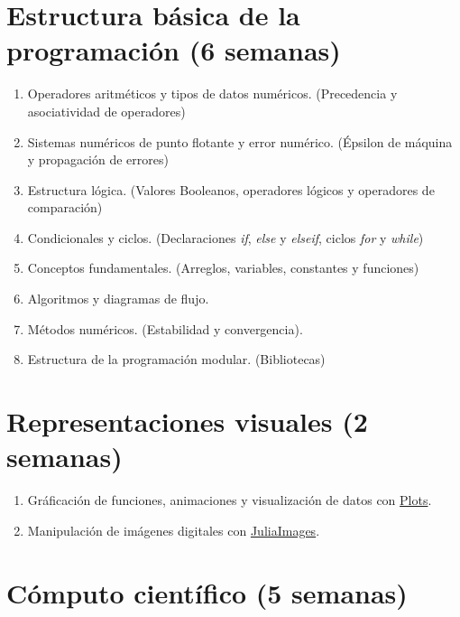 \documentclass[a4paper]{article}
\begin{document}
\section{Estructura básica de la programación (6 semanas)} \label{Sec: Estructura básica de la programación (3 semanas)}

\begin{enumerate}[label=\arabic*.]

    \item Operadores aritméticos y tipos de datos numéricos. (Precedencia y asociatividad de operadores)
    \item Sistemas numéricos de punto flotante y error numérico. (Épsilon de máquina y propagación de errores)
    \item Estructura lógica. (Valores Booleanos, operadores lógicos y operadores de comparación)
    \item Condicionales y ciclos. (Declaraciones \emph{if}, \emph{else} y \emph{elseif}, ciclos \emph{for} y \emph{while})
    \item Conceptos fundamentales. (Arreglos, variables, constantes y funciones)
    \item Algoritmos y diagramas de flujo.
    \item Métodos numéricos. (Estabilidad y convergencia).
    \item Estructura de la programación modular. (Bibliotecas)
\end{enumerate}

\section{Representaciones visuales (2 semanas)} \label{Sec: Representaciones visuales (2 semanas)}

\begin{enumerate}[label=\arabic*.]

    \item Gráficación de funciones, animaciones y visualización de datos  con \href{https://docs.juliaplots.org/latest/}{Plots}.
    \item Manipulación de imágenes digitales con \href{https://juliaimages.org/latest/}{JuliaImages}.
\end{enumerate}

\section{Cómputo científico (5 semanas)} \label{Sec: Cómputo científico: construcción de pseudocódigo e implementación en código (8 semanas)}
\end{document}
